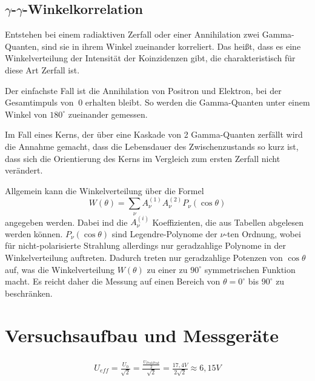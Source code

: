\documentclass[11pt]{scrartcl}
\begin{document}
\subsection{$\gamma$-$\gamma$-Winkelkorrelation}
Entstehen bei einem radiaktiven Zerfall oder einer Annihilation zwei Gamma-Quanten, sind sie
in ihrem Winkel zueinander korreliert. Das heißt, dass es eine Winkelverteilung der Intensität
der Koinzidenzen gibt, die charakteristisch für diese Art Zerfall ist. 

Der einfachste Fall ist die Annihilation von Positron und Elektron, bei der Gesamtimpuls von $~0$ 
erhalten bleibt. So werden die Gamma-Quanten unter einem Winkel von $180^\circ$ zueinander gemessen.

Im Fall eines Kerns, der über eine Kaskade von 2 Gamma-Quanten zerfällt wird die Annahme gemacht, dass
die Lebensdauer des Zwischenzustands so kurz ist, dass sich die Orientierung des Kerns im Vergleich 
zum ersten Zerfall nicht verändert. 

Allgemein kann die Winkelverteilung über die Formel
\begin{equation}
 W(\theta)=\sum_\nu A_\nu^{(1)} A_\nu^{(2)} P_\nu ( \cos \theta)
\end{equation}
angegeben werden. Dabei ind die $A_\nu^{(i)}$ Koeffizienten, die aus Tabellen abgelesen werden können.
$P_\nu(\cos \theta)$ sind Legendre-Polynome der $\nu$-ten Ordnung, wobei für nicht-polarisierte Strahlung
allerdings nur geradzahlige Polynome in der Winkelverteilung auftreten. Dadurch treten nur geradzahlige
Potenzen von $\cos \theta$ auf, was die Winkelverteilung $W(\theta)$ zu einer zu $90^\circ$ symmetrischen
Funktion macht. Es reicht daher die Messung auf einen Bereich von $\theta=0^\circ$ bis $90^\circ$ zu 
beschränken.

\section{Versuchsaufbau und Messgeräte}

\begin{align}
U_{eff} = \frac{U_0}{\sqrt{2}} = \frac{\frac{U_{PeakPeak}}{2}}{\sqrt{2}} = \frac{17,4 V}{ 2 \sqrt{2}} \approx 6,15 V
\end{align}


\end{document}

